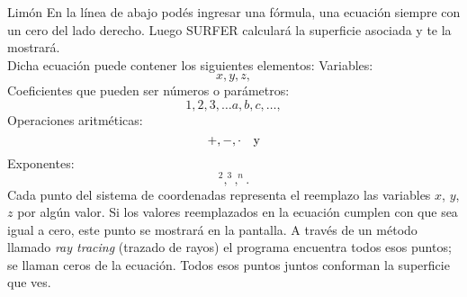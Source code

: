 \begin{surferPage}{Limón}
En la l{\'i}nea de abajo pod{\'e}s ingresar una f{\'o}rmula, una ecuaci{\'o}n siempre con un cero del lado derecho. Luego SURFER calcular{\'a} la superficie asociada y te la mostrar{\'a}. 
\\
Dicha ecuaci{\'o}n puede contener los siguientes elementos:
\newline
Variables:
\[x, y, z, \]
Coeficientes que pueden ser n{\'u}meros o par{\'a}metros:
\[1, 2, 3, \dots a, b, c, \dots, \]
Operaciones aritm{\'e}ticas:
\[+,  - , \cdot \quad \textnormal{y} \]
Exponentes:
\[ ^2, ^3, ^n .\]
Cada punto del sistema de coordenadas representa el reemplazo las variables $x$, $y$, $z$ por alg{\'u}n valor. Si los valores reemplazados en la ecuaci{\'o}n cumplen con que sea igual a cero, este punto se mostrar{\'a} en la pantalla. A trav{\'e}s de un m{\'e}todo llamado \textit{ray tracing} (trazado de rayos) el programa encuentra todos esos puntos; se llaman ceros de la ecuaci{\'o}n. Todos esos puntos juntos conforman la superficie que ves.
\end{surferPage}
